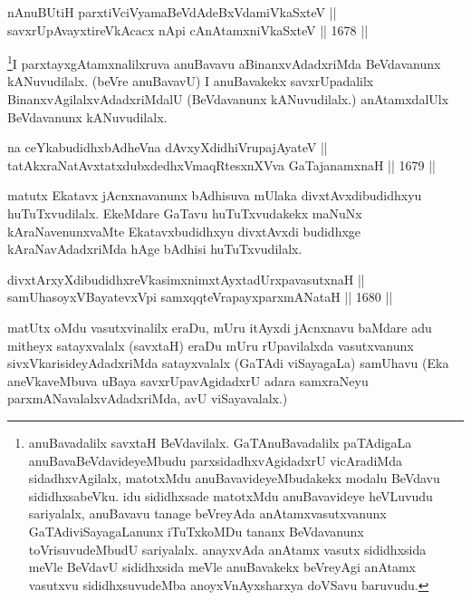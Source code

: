 
\begin{shl}
nAnuBUtiH parxtiVciVyamaBeVdAdeBxVdamiVkaSxteV || \\
savxrUpAvayxtireVkAcacx nApi cAnAtamxniVkaSxteV \hfill || 1678 ||  
\end{shl}

\begin{artha}
\footnote{anuBavadalilx savxtaH BeVdavilalx. GaTAnuBavadalilx paTAdigaLa anuBavaBeVdavideyeMbudu parxsidadhxvAgidadxrU vicAradiMda sidadhxvAgilalx, matotxMdu anuBavavideyeMbudakekx modalu BeVdavu sididhxsabeVku. idu sididhxsade matotxMdu anuBavavideye heVLuvudu sariyalalx, anuBavavu tanage beVreyAda anAtamxvasutxvanunx GaTAdiviSayagaLanunx iTuTxkoMDu tananx BeVdavanunx toVrisuvudeMbudU sariyalalx. anayxvAda anAtamx vasutx sididhxsida meVle BeVdavU sididhxsida meVle anuBavakekx beVreyAgi anAtamx vasutxvu sididhxsuvudeMba anoyxVnAyxsharxya doVSavu baruvudu.}I parxtayxgAtamxnalilxruva anuBavavu aBinanxvAdadxriMda BeVdavanunx kANuvudilalx. (beVre anuBavavU) I anuBavakekx savxrUpadalilx BinanxvAgilalxvAdadxriMdalU (BeVdavanunx kANuvudilalx.) anAtamxdalUlx BeVdavanunx kANuvudilalx.
\end{artha}


\begin{shl}
na ceYkabudidhxbAdheVna dAvxyXdidhiVrupajAyateV || \\
tatAkxraNatAvxtatxdubxdedhxVmaqRtesxnXVva GaTajanamxnaH \hfill || 1679 ||  
\end{shl}

\begin{artha}
matutx Ekatavx jAcnxnavanunx bAdhisuva mUlaka divxtAvxdibudidhxyu huTuTxvudilalx. EkeMdare GaTavu huTuTxvudakekx maNuNx kAraNavenunxvaMte Ekatavxbudidhxyu divxtAvxdi budidhxge kAraNavAdadxriMda hAge bAdhisi huTuTxvudilalx.
\end{artha}

\begin{shl}
divxtArxyXdibudidhxreVkasimxnimxtAyx\s tadUrxpavasutxnaH || \\
samUhasoyxVBayatevxV\s pi samxqqteVrapayxparxmANataH \hfill || 1680 ||  
\end{shl}

\begin{artha}
matUtx oMdu vasutxvinalilx eraDu, mUru itAyxdi jAcnxnavu baMdare adu mitheyx satayxvalalx (savxtaH) eraDu mUru rUpavilalxda vasutxvanunx sivxVkarisideyAdadxriMda satayxvalalx (GaTAdi viSayagaLa) samUhavu (Eka aneVkaveMbuva uBaya savxrUpavAgidadxrU adara samxraNeyu parxmANavalalxvAdadxriMda, avU viSayavalalx.)
\end{artha}

